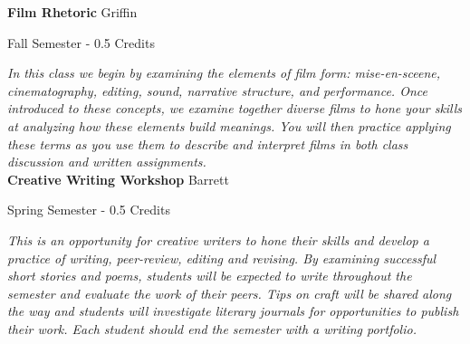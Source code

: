 \noindent\textbf{Film Rhetoric} \hfill Griffin

\noindent Fall Semester - 0.5 Credits

\vspace{1mm}\emph{In this class we begin by examining the elements of film form: mise-en-sceene, cinematography, editing, sound, narrative structure, and performance. Once introduced to these concepts, we examine together diverse films to hone your skills at analyzing how these elements build meanings. You will then practice applying these terms as you use them to describe and interpret films in both class discussion and written assignments.}\\

%
%

%
%

\noindent\textbf{Creative Writing Workshop} \hfill Barrett

\noindent Spring Semester - 0.5 Credits

\vspace{1mm}\emph{This is an opportunity for creative writers to hone their skills and develop a practice of writing, peer-review, editing and revising.  By examining successful short stories and poems, students will be expected to write throughout the semester and evaluate the work of their peers.  Tips on craft will be shared along the way and students will investigate literary journals for opportunities to publish their work.  Each student should end the semester with a writing portfolio.    }\\


